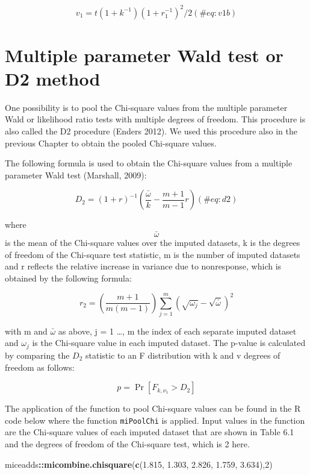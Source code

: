 \documentclass[
]{book}
\newenvironment{Shaded}{\begin{snugshade}}{\end{snugshade}}
\newcommand{\DecValTok}[1]{\textcolor[rgb]{0.00,0.00,0.81}{#1}}
\newcommand{\FloatTok}[1]{\textcolor[rgb]{0.00,0.00,0.81}{#1}}
\newcommand{\KeywordTok}[1]{\textcolor[rgb]{0.13,0.29,0.53}{\textbf{#1}}}
\newcommand{\NormalTok}[1]{#1}
\newcommand{\OperatorTok}[1]{\textcolor[rgb]{0.81,0.36,0.00}{\textbf{#1}}}
\begin{document}
\begin{equation}
v_1 = t(1+k^{-1})(1+r_1^{-1})^2/2 
(\#eq:v1b)
\end{equation}

\hypertarget{multiple-parameter-wald-test-or-d2-method}{%
\section{Multiple parameter Wald test or D2
method}\label{multiple-parameter-wald-test-or-d2-method}}

One possibility is to pool the Chi-square values from the multiple
parameter Wald or likelihood ratio tests with multiple degrees of
freedom. This procedure is also called the D2 procedure (Enders 2012).
We used this procedure also in the previous Chapter to obtain the pooled
Chi-square values.

The following formula is used to obtain the Chi-square values from a
multiple parameter Wald test (Marshall, 2009):

\begin{equation}
 D_2 = (1+r)^{-1} (\frac{ \bar\omega}{k}-\frac{ m+1}{m-1}r)
  (\#eq:d2)
\end{equation}

where \[\bar\omega\] is the mean of the Chi-square values over the
imputed datasets, k is the degrees of freedom of the Chi-square test
statistic, m is the number of imputed datasets and r reflects the
relative increase in variance due to nonresponse, which is obtained by
the following formula:

\[r_2 = \left(\frac{m+1}{m(m-1)}\right)\sum_{j=1}^m\left(\sqrt{\omega_j}-{\sqrt{\bar\omega}}\right)^2\]

with m and \(\bar\omega\) as above, j = 1 \ldots, m the index of each
separate imputed dataset and \(\omega_j\) is the Chi-square value in
each imputed dataset. The p-value is calculated by comparing the \(D_2\)
statistic to an F distribution with k and v degrees of freedom as
follows:

\[p = \Pr[F_{k,\nu_1}>D_2]\]

The application of the function to pool Chi-square values can be found
in the R code below where the function \texttt{miPoolChi} is applied.
Input values in the function are the Chi-square values of each imputed
dataset that are shown in Table 6.1 and the degrees of freedom of the
Chi-square test, which is 2 here.

\begin{Shaded}
\begin{Highlighting}[]
\NormalTok{miceadds}\OperatorTok{::}\KeywordTok{micombine.chisquare}\NormalTok{(}\KeywordTok{c}\NormalTok{(}\FloatTok{1.815}\NormalTok{,}
            \FloatTok{1.303}\NormalTok{,}
            \FloatTok{2.826}\NormalTok{,}
            \FloatTok{1.759}\NormalTok{,}
            \FloatTok{3.634}\NormalTok{),}\DecValTok{2}\NormalTok{)}
\end{Highlighting}
\end{Shaded}
\end{document}
